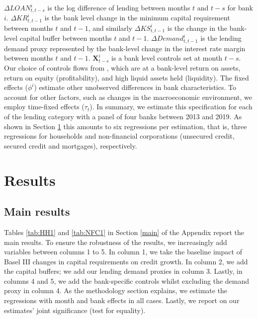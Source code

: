 \documentclass[
]{article}
\begin{document}
\(\Delta LOAN^i_{t, t-s}\) is the log difference of lending between months \(t\) and \(t-s\) for bank \(i\). \(\Delta KR^i_{t, t-1}\) is the bank level change in the minimum capital requirement between months \(t\) and \(t-1\), and similarly \(\Delta KS^i_{t, t-1}\) is the change in the bank-level capital buffer between months \(t\) and \(t-1\). \(\Delta Demand^i_{t, t-1}\) is the lending demand proxy represented by the bank-level change in the interest rate margin between months \(t\) and \(t-1\). \(\pmb{X}^i_{t-s}\) is a bank level controls set at month \(t-s\). Our choice of controls flows from \citet{fang2020bank}, which are at a bank-level return on assets, return on equity (profitability), and high liquid assets held (liquidity). The fixed effects (\(\phi^i\)) estimate other unobserved differences in bank characteristics. To account for other factors, such as changes in the macroeconomic environment, we employ time-fixed effects (\(\tau_t\)). In summary, we estimate this specification for each of the lending category with a panel of four banks between 2013 and 2019. As shown in Section \ref{results} this amounts to six regressions per estimation, that is, three regressions for households and non-financial corporations (unsecured credit, secured credit and mortgages), respectively.

\hypertarget{results}{%
\section{Results}\label{results}}

\hypertarget{main-results}{%
\subsection{Main results}\label{main-results}}

Tables \ref{tab:HH1} and \ref{tab:NFC1} in Section \ref{main} of the Appendix report the main results. To ensure the robustness of the results, we increasingly add variables between columns 1 to 5. In column 1, we take the baseline impact of Basel III changes in capital requirements on credit growth. In column 2, we add the capital buffers; we add our lending demand proxies in column 3. Lastly, in columns 4 and 5, we add the bank-specific controls whilst excluding the demand proxy in column 4. As the methodology section explains, we estimate the regressions with month and bank effects in all cases. Lastly, we report on our estimates' joint significance (test for equality).
\end{document}
